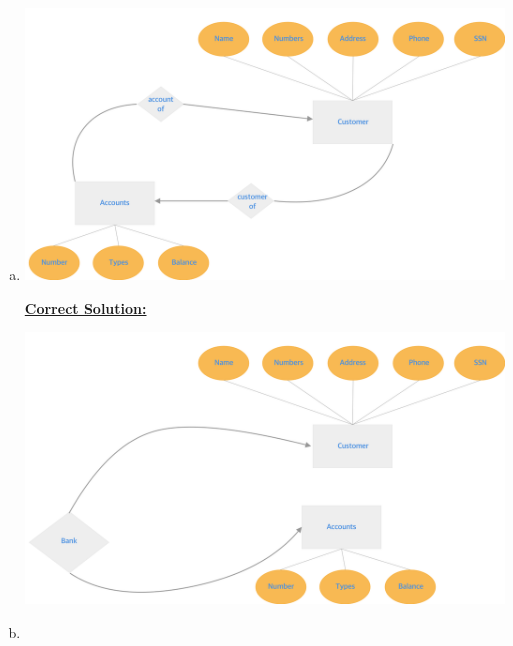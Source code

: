 \documentclass[12pt]{article}
\begin{document}
\begin{enumerate}[1.]
\begin{enumerate}[a)]
        \item

        \begin{center}
        \includegraphics[width=\linewidth]{images/worksheet_14_solution_16.png}
        \end{center}

        \bigskip

        \begin{mdframed}
            \underline{\textbf{Correct Solution:}}

            \bigskip

            \begin{center}
            \includegraphics[width=\linewidth]{images/worksheet_14_solution_18.png}
            \end{center}
        \end{mdframed}

        \item


\end{enumerate}
\end{enumerate}
\end{document}
